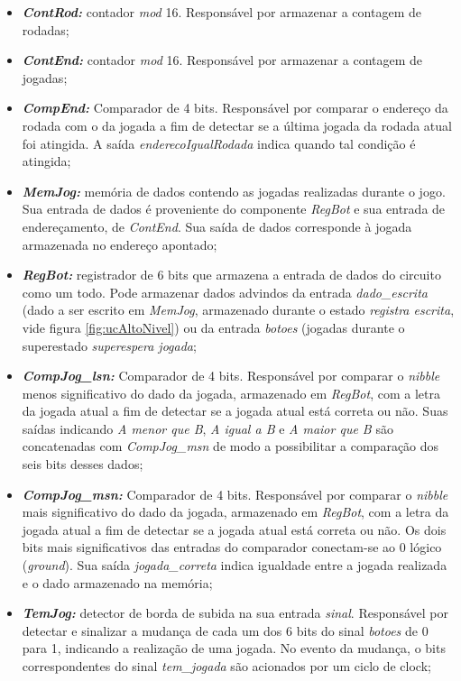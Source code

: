 \documentclass[amsmath,amssymb,floatfix]{report}
\begin{document}
\begin{itemize}
    \item \textbf{\textit{ContRod:}} contador \textit{mod} 16. Responsável por armazenar a contagem de rodadas;
    \item \textbf{\textit{ContEnd:}} contador \textit{mod} 16. Responsável por armazenar a contagem de jogadas;
    \item \textbf{\textit{CompEnd:}} Comparador de 4 bits. Responsável por comparar o endereço da rodada com o da jogada a fim de detectar se a última jogada da rodada atual foi atingida. A saída \textit{enderecoIgualRodada} indica quando tal condição é atingida;
    \item \textbf{\textit{MemJog:}} memória de dados contendo as jogadas realizadas durante o jogo. Sua entrada de dados é proveniente do componente \textit{RegBot} e sua entrada de endereçamento, de \textit{ContEnd}. Sua saída de dados corresponde à jogada armazenada no endereço apontado;
    \item \textbf{\textit{RegBot:}} registrador de 6 bits que armazena a entrada de dados do circuito como um todo. Pode armazenar dados advindos da entrada \textit{dado\_escrita} (dado a ser escrito em \textit{MemJog}, armazenado  durante o estado \textit{registra escrita}, vide figura \ref{fig:ucAltoNivel}) ou da entrada \textit{botoes} (jogadas durante o superestado \textit{superespera jogada};
    \item \textbf{\textit{CompJog\_lsn:}} Comparador de 4 bits. Responsável por comparar o \textit{nibble} menos significativo do dado da jogada, armazenado em \textit{RegBot}, com a letra da jogada atual a fim de detectar se a jogada atual está correta ou não. Suas saídas indicando \textit{A menor que B}, \textit{A igual a B} e \textit{A maior que B} são concatenadas com \textit{CompJog\_msn} de modo a possibilitar a comparação dos seis bits desses dados;
    \item \textbf{\textit{CompJog\_msn:}} Comparador de 4 bits. Responsável por comparar o \textit{nibble} mais significativo do dado da jogada, armazenado em \textit{RegBot}, com a letra da jogada atual a fim de detectar se a jogada atual está correta ou não. Os dois bits mais significativos das entradas do comparador conectam-se ao 0 lógico (\textit{ground}). Sua saída \textit{jogada\_correta} indica igualdade entre a jogada realizada e o dado armazenado na memória;
    \item \textbf{\textit{TemJog:}} detector de borda de subida na sua entrada \textit{sinal}. Responsável por detectar e sinalizar a mudança de cada um dos 6 bits do sinal \textit{botoes} de 0 para 1, indicando a realização de uma jogada. No evento da mudança, o bits correspondentes do sinal \textit{tem\_jogada} são acionados por um ciclo de clock;

\end{itemize}
\end{document}
